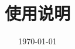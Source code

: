 \documentclass[
class = book,
zihao = -4,
font = noto,
paper = a4paper,
openany
]{easybook}
\begin{document}
	\title{\songti \NameCN \\ \Version \\ 使用说明}
	\date{\today}

	\frontmatter[roman]
	\maketitle
	\tableofcontents

	\mainmatter*

	
	
	
	
	
	
	

	\backmatter
\end{document}
